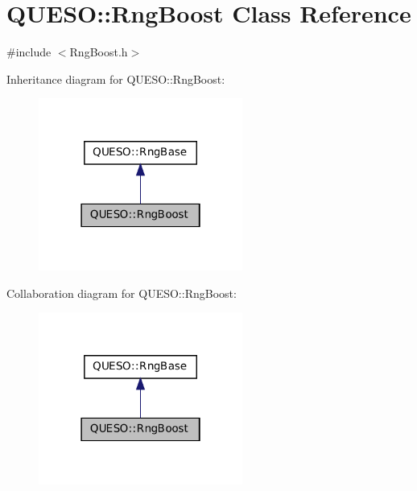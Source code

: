 \hypertarget{class_q_u_e_s_o_1_1_rng_boost}{\section{Q\-U\-E\-S\-O\-:\-:Rng\-Boost Class Reference}
\label{class_q_u_e_s_o_1_1_rng_boost}
}


{\ttfamily \#include $<$Rng\-Boost.\-h$>$}



Inheritance diagram for Q\-U\-E\-S\-O\-:\-:Rng\-Boost\-:
\nopagebreak
\begin{figure}[H]
\begin{center}
\leavevmode
\includegraphics[width=190pt]{class_q_u_e_s_o_1_1_rng_boost__inherit__graph}
\end{center}
\end{figure}


Collaboration diagram for Q\-U\-E\-S\-O\-:\-:Rng\-Boost\-:
\nopagebreak
\begin{figure}[H]
\begin{center}
\leavevmode
\includegraphics[width=190pt]{class_q_u_e_s_o_1_1_rng_boost__coll__graph}
\end{center}
\end{figure}
